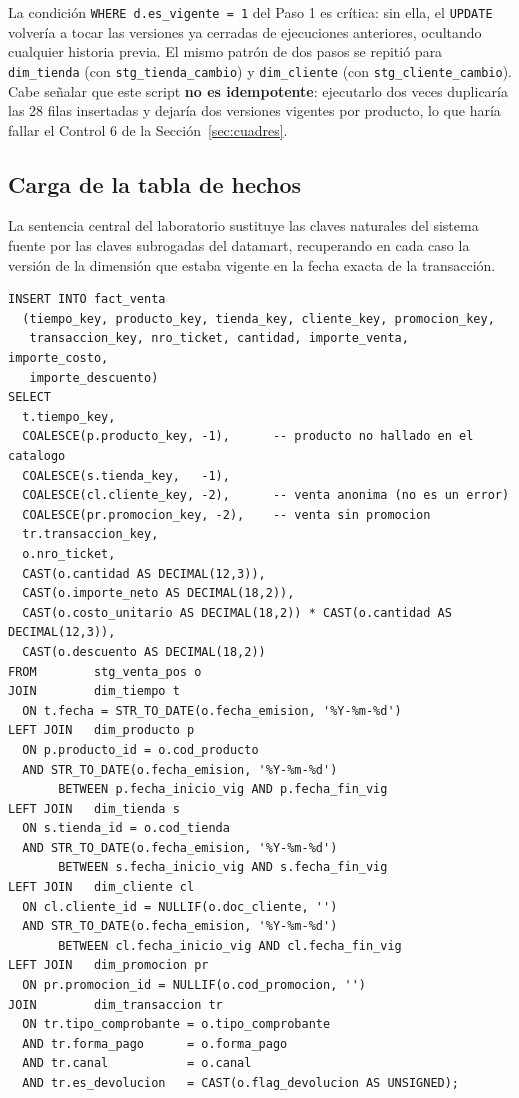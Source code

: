 \documentclass[11pt,a4paper]{article}
\begin{document}
La condición \texttt{WHERE d.es\_vigente = 1} del Paso 1 es crítica: sin ella, el \texttt{UPDATE} volvería a tocar las versiones ya cerradas de ejecuciones anteriores, ocultando cualquier historia previa. El mismo patrón de dos pasos se repitió para \texttt{dim\_tienda} (con \texttt{stg\_tienda\_cambio}) y \texttt{dim\_cliente} (con \texttt{stg\_cliente\_cambio}). Cabe señalar que este script \textbf{no es idempotente}: ejecutarlo dos veces duplicaría las 28 filas insertadas y dejaría dos versiones vigentes por producto, lo que haría fallar el Control 6 de la Sección~\ref{sec:cuadres}.

\subsection{Carga de la tabla de hechos}

La sentencia central del laboratorio sustituye las claves naturales del sistema fuente por las claves subrogadas del datamart, recuperando en cada caso la versión de la dimensión que estaba vigente en la fecha exacta de la transacción.

\begin{lstlisting}[caption={Carga de \texttt{fact\_venta}: \texttt{LEFT JOIN} + \texttt{COALESCE} hacia las filas especiales y \texttt{BETWEEN} sobre la vigencia (\texttt{dm\_mercandina\_carga.sql}).}, label={lst:carga}]
INSERT INTO fact_venta
  (tiempo_key, producto_key, tienda_key, cliente_key, promocion_key,
   transaccion_key, nro_ticket, cantidad, importe_venta, importe_costo,
   importe_descuento)
SELECT
  t.tiempo_key,
  COALESCE(p.producto_key, -1),      -- producto no hallado en el catalogo
  COALESCE(s.tienda_key,   -1),
  COALESCE(cl.cliente_key, -2),      -- venta anonima (no es un error)
  COALESCE(pr.promocion_key, -2),    -- venta sin promocion
  tr.transaccion_key,
  o.nro_ticket,
  CAST(o.cantidad AS DECIMAL(12,3)),
  CAST(o.importe_neto AS DECIMAL(18,2)),
  CAST(o.costo_unitario AS DECIMAL(18,2)) * CAST(o.cantidad AS DECIMAL(12,3)),
  CAST(o.descuento AS DECIMAL(18,2))
FROM        stg_venta_pos o
JOIN        dim_tiempo t
  ON t.fecha = STR_TO_DATE(o.fecha_emision, '%Y-%m-%d')
LEFT JOIN   dim_producto p
  ON p.producto_id = o.cod_producto
  AND STR_TO_DATE(o.fecha_emision, '%Y-%m-%d')
       BETWEEN p.fecha_inicio_vig AND p.fecha_fin_vig
LEFT JOIN   dim_tienda s
  ON s.tienda_id = o.cod_tienda
  AND STR_TO_DATE(o.fecha_emision, '%Y-%m-%d')
       BETWEEN s.fecha_inicio_vig AND s.fecha_fin_vig
LEFT JOIN   dim_cliente cl
  ON cl.cliente_id = NULLIF(o.doc_cliente, '')
  AND STR_TO_DATE(o.fecha_emision, '%Y-%m-%d')
       BETWEEN cl.fecha_inicio_vig AND cl.fecha_fin_vig
LEFT JOIN   dim_promocion pr
  ON pr.promocion_id = NULLIF(o.cod_promocion, '')
JOIN        dim_transaccion tr
  ON tr.tipo_comprobante = o.tipo_comprobante
  AND tr.forma_pago      = o.forma_pago
  AND tr.canal           = o.canal
  AND tr.es_devolucion   = CAST(o.flag_devolucion AS UNSIGNED);
\end{lstlisting}
\end{document}
